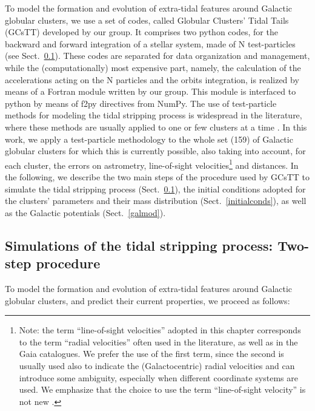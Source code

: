     To model the formation and evolution of extra-tidal features around Galactic globular clusters, we use a set of codes, called Globular Clusters' Tidal Tails (GCsTT)  developed by our group. It comprises two python codes, for the backward and forward integration of a stellar system, made of N test-particles (see Sect.~\ref{numerical}). These codes are separated for data organization and management, while the (computationally) most expensive part, namely, the calculation of the accelerations acting on the N particles and the orbits integration, is realized by means of a Fortran module written by our group. This module is interfaced to python by means of f2py directives from NumPy. The use of test-particle methods for modeling the tidal stripping process is widespread in the literature, where these methods are  usually applied to one or few clusters at a time \citep[see, e.g., ][]{2012MNRAS.423.2845L, 2012A&A...546L...7M, 2019MNRAS.488.1535P, 2021MNRAS.505.3033P, 2022ApJ...929...89G}. In this work, we apply a test-particle methodology to the whole set (159) of Galactic globular clusters for which this is currently possible, also taking into account, for each cluster, the errors on astrometry, line-of-sight velocities\footnote{Note: the term ``line-of-sight velocities''  adopted in this chapter corresponds to the term ``radial velocities'' often used in the literature, as well as in the Gaia catalogues. We prefer the use of the first term, since the second is usually used also to indicate the (Galactocentric) radial velocities and can introduce some ambiguity, especially when different coordinate systems are used. We emphasize that the choice to use the term ``line-of-sight velocity'' is not new \citep[see, e.g., ][]{2021MNRAS.505.5978V}.} and distances. In the following, we describe the two main steps of the procedure used by GCsTT  to simulate the tidal stripping process (Sect.~\ref{numerical}), the initial conditions adopted for the clusters' parameters and their mass distribution (Sect.~\ref{initialconds}), as well as the Galactic potentials (Sect.~\ref{galmod}).
    \subsection{Simulations of the tidal stripping process:  Two-step procedure}\label{numerical}
        To model the formation and evolution of extra-tidal features around Galactic globular clusters, and predict their current properties, we proceed as follows: 

